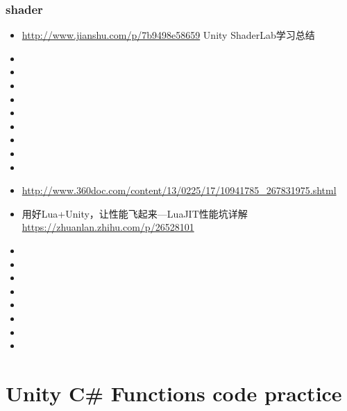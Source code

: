 \documentclass[9pt, b5paper]{article}
\begin{document}
\subsubsection{shader}
\label{sec:org6fa7ba2}
\begin{itemize}
\item \url{http://www.jianshu.com/p/7b9498e58659} Unity ShaderLab学习总结
\item 

\item 

\item 

\item 

\item 

\item 

\item 

\item 

\item 


\item \url{http://www.360doc.com/content/13/0225/17/10941785\_267831975.shtml}
\item 用好Lua+Unity，让性能飞起来—LuaJIT性能坑详解 \url{https://zhuanlan.zhihu.com/p/26528101}
\item 

\item 

\item 

\item 

\item 

\item 

\item 

\item 
\end{itemize}

\section{Unity C\# Functions code practice}
\label{sec:orgc4fa09a}
\end{document}
